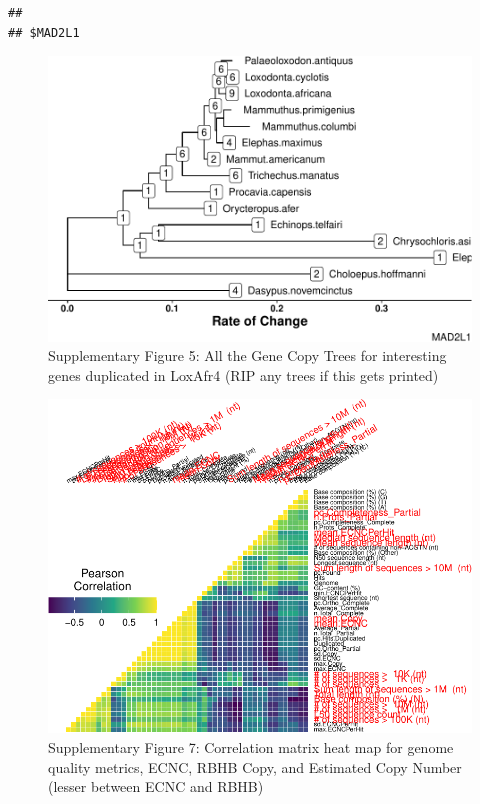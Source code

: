 \documentclass[10pt,letterpaper]{article}
\begin{document}
\begin{verbatim}
## 
## $MAD2L1
\end{verbatim}

\begin{figure}
\centering
\includegraphics{paper_PLOS_draft_files/figure-latex/Supplementary Figure 5-10.pdf}
\caption{Supplementary Figure 5: All the Gene Copy Trees for interesting
genes duplicated in LoxAfr4 (RIP any trees if this gets printed)}
\end{figure}

\begin{figure}
\centering
\includegraphics{paper_PLOS_draft_files/figure-latex/Supplementary Figure 7-1.pdf}
\caption{Supplementary Figure 7: Correlation matrix heat map for genome
quality metrics, ECNC, RBHB Copy, and Estimated Copy Number (lesser
between ECNC and RBHB)}
\end{figure}
\end{document}
